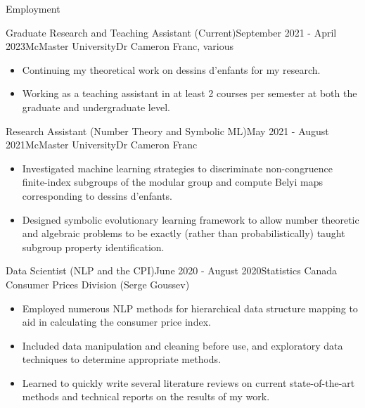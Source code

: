 \begin{rSection}{Employment}



\begin{rSubsection}{Graduate Research and Teaching Assistant (Current)}{September 2021 - April 2023}{McMaster University}{Dr Cameron Franc, various}
	\begin{itemize}
      \addtolength\itemsep{-0.5em}
      \item Continuing my theoretical work on dessins d'enfants for my research.
      \item Working as a teaching assistant in at least 2 courses per semester at both the graduate and undergraduate level.
    \end{itemize}
\end{rSubsection}

\begin{rSubsection}{Research Assistant (Number Theory and Symbolic ML)}{May 2021 - August 2021}{McMaster University}{Dr Cameron Franc}
	\begin{itemize}
      \addtolength\itemsep{-0.5em}
      \item Investigated machine learning strategies to discriminate non-congruence finite-index subgroups of the modular group and compute Belyi maps corresponding to dessins d'enfants.
      \item Designed symbolic evolutionary learning framework to allow number theoretic and algebraic problems to be exactly (rather than probabilistically) taught subgroup property identification.
    \end{itemize}
\end{rSubsection}

\begin{rSubsection}{Data Scientist (NLP and the CPI)}{June 2020 - August 2020}{Statistics Canada }{Consumer Prices Division (Serge Goussev)}
    \begin{itemize}
      \addtolength\itemsep{-0.5em}
      \item Employed numerous NLP methods for hierarchical data structure mapping to aid in calculating the consumer price index.
      \item Included data manipulation and cleaning before use, and exploratory data techniques to determine appropriate methods.
      \item Learned to quickly write several literature reviews on current state-of-the-art methods and technical reports on the results of my work.
    \end{itemize}
\end{rSubsection}


\end{rSection}
